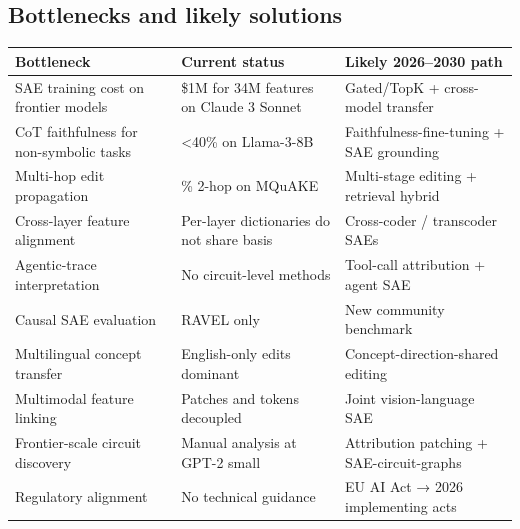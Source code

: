 \subsection{Bottlenecks and likely solutions}\label{bottlenecks-and-likely-solutions}

{\def\LTcaptype{none} %
\begin{longtable}[]{@{}
  >{\raggedright\arraybackslash}p{}
  >{\raggedright\arraybackslash}p{}
  >{\raggedright\arraybackslash}p{}@{}}
\toprule\noalign{}
\begin{minipage}[b]{\linewidth}\raggedright
Bottleneck
\end{minipage} & \begin{minipage}[b]{\linewidth}\raggedright
Current status
\end{minipage} & \begin{minipage}[b]{\linewidth}\raggedright
Likely 2026--2030 path
\end{minipage} \\
\midrule\noalign{}
\endhead
\bottomrule\noalign{}
\endlastfoot
SAE training cost on frontier models & \$1M for 34M features on Claude 3 Sonnet & Gated/TopK + cross-model transfer \\
CoT faithfulness for non-symbolic tasks & \textless40\% on Llama-3-8B & Faithfulness-fine-tuning + SAE grounding \\
Multi-hop edit propagation & 21\% 2-hop on MQuAKE & Multi-stage editing + retrieval hybrid \\
Cross-layer feature alignment & Per-layer dictionaries do not share basis & Cross-coder / transcoder SAEs \\
Agentic-trace interpretation & No circuit-level methods & Tool-call attribution + agent SAE \\
Causal SAE evaluation & RAVEL only & New community benchmark \\
Multilingual concept transfer & English-only edits dominant & Concept-direction-shared editing \\
Multimodal feature linking & Patches and tokens decoupled & Joint vision-language SAE \\
Frontier-scale circuit discovery & Manual analysis at GPT-2 small & Attribution patching + SAE-circuit-graphs \\
Regulatory alignment & No technical guidance & EU AI Act → 2026 implementing acts \\
\end{longtable}
}

